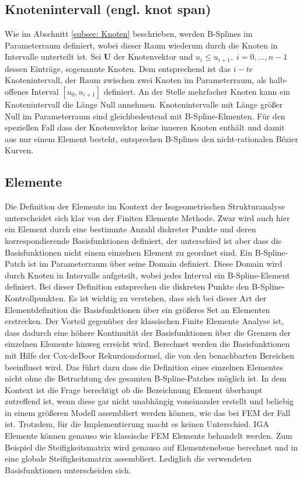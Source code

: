 \documentclass[german,a4paper,12pt,oneside]{scrbook}
\theoremstyle{definition}
\theoremstyle{definition}
\theoremstyle{definition}
\theoremstyle{definition}
\theoremstyle{definition}
\theoremstyle{definition}
\begin{document}
\subsection{Knotenintervall (engl. knot span)}
\label{subsec: Knotenintervall}
Wie im Abschnitt \ref{subsec: Knoten} beschrieben, werden B-Splines im Parameterraum definiert, wobei dieser Raum wiederum durch die Knoten in Intervalle unterteilt ist. Sei $\bm{U}$ der Knotenvektor und $u_i \leq u_{i+1}, \; i = 0,...,n-1$  dessen Einträge, sogenannte Knoten. Dem entsprechend ist das $i-te$ Knotenintervall, der Raum zwischen zwei Knoten im Parameterraum, als halb-offenes Interval $[u_0, u_{i+1}]$ definiert. An der Stelle mehrfacher Knoten kann ein Knotenintervall die Länge Null annehmen. Knotenintervalle mit Länge größer Null im Parameterraum sind gleichbedeutend mit B-Spline-Elmenten. Für den speziellen Fall dass der Knotenvektor keine inneren Knoten enthält und damit aus nur einem Element besteht, entsprechen B-Splines den nicht-rationalen Bézier Kurven. 

\subsection{Elemente}
Die Definition der Elemente im Kontext der Isogeometrischen Strukturanalyse unterscheidet sich klar von der Finiten Elemente Methode. Zwar wird auch hier ein Element durch eine bestimmte Anzahl diskreter Punkte und deren korrespondierende Basisfunktionen definiert, der unterschied ist aber dass die Basisfunktionen nicht einem einzelnen Element zu geordnet sind. Ein B-Spline-Patch ist im Parameterraum über seine Domain definiert. Diese Domain wird durch Knoten in Intervalle aufgeteilt, wobei jedes Interval ein B-Spline-Element definiert. Bei dieser Definition entsprechen die diskreten Punkte den B-Spline-Kontrollpunkten. Es ist wichtig zu verstehen, dass sich bei dieser Art der Elementdefinition die Basisfunktionen über ein größeres Set an Elementen erstrecken. Der Vorteil gegenüber der klassischen Finite Elemente Analyse ist, dass dadurch eine höhere Kontinuität der Basisfunktionen über die Grenzen der einzelnen Elemente hinweg erreicht wird. 
Berechnet werden die Basisfunktionen mit Hilfe der Cox-deBoor Rekursionsformel, die von den benachbarten Bereichen beeinflusst wird. Das führt dazu dass die Definition eines einzelnen Elementes nicht ohne die Betrachtung des gesamten B-Spline-Patches möglich ist. In dem Kontext ist die Frage berechtigt ob die Bezeichnung Element überhaupt zutreffend ist, wenn diese gar nicht unabhängig voneinander erstellt und beliebig in einem größeren Modell assembliert werden können, wie das bei FEM der Fall ist. Trotzdem, für die Implementierung macht es keinen Unterschied. IGA Elemente können genauso wie klassische FEM Elemente behandelt werden. Zum Beispiel die Steifigkeitsmatrix wird genauso auf Elementenebene berechnet und in eine globale Steifigkeitsmatrix assembliert. Lediglich die verwendeten Basisfunktionen unterscheiden sich. 
\end{document}
